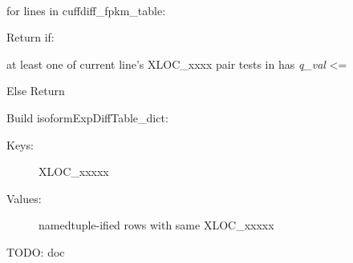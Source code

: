 \documentclass[letterpaper,10pt,english]{sphinxmanual}
\begin{document}
\begin{fulllineitems}
\label{code:gfunc.parsers.Cufflinks.am_i_sigDiff}~
\begin{DUlineblock}{0em}
\item[] for lines in cuffdiff\_fpkm\_table:
\item[]
\begin{DUlineblock}{\DUlineblockindent}
\item[] Return  if:
\item[]
\begin{DUlineblock}{\DUlineblockindent}
\item[] at least one of current line's XLOC\_xxxx pair tests in  has \emph{q\_val} \textless{}= 
\end{DUlineblock}
\item[] Else Return 
\end{DUlineblock}
\end{DUlineblock}

\end{fulllineitems}


\begin{fulllineitems}
\label{code:gfunc.parsers.Cufflinks.build_expDiffTable_dict}
Build isoformExpDiffTable\_dict:
\begin{description}
\item[{Keys:}] \leavevmode
XLOC\_xxxxx

\item[{Values:}] \leavevmode
namedtuple-ified rows with same XLOC\_xxxxx

\end{description}

\end{fulllineitems}


\begin{fulllineitems}
\label{code:gfunc.parsers.Cufflinks.transfer_nearestRefgeneSymbol_from_isoform_to_gene_tracking}
TODO: doc

\end{fulllineitems}
\end{document}
